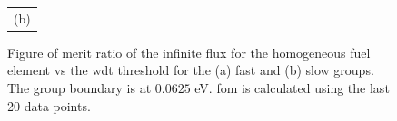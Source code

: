 \begin{figure}[hbtp]
\begin{tabular}{c}
    (b) 
  \end{tabular}
  \caption[Figure of merit ratio of the infinite flux for the
  homogeneous fuel element]{Figure of merit ratio of the infinite flux
    for the homogeneous fuel element vs the
    \gls{wdt} threshold for the (a) fast and (b) slow 
    groups. The group boundary is at $0.0625$ eV. \gls{fom} is
    calculated using the last 20 data points.}
  \label{fig:fast_inf_flx}
\end{figure}





